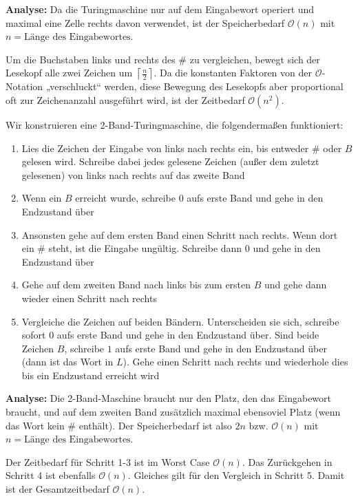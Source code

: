\textbf{Analyse:} Da die Turingmaschine nur auf dem Eingabewort operiert und
maximal eine Zelle rechts davon verwendet, ist der Speicherbedarf
$\mathcal{O}(n)$ mit $n = \text{Länge des Eingabewortes}$.

Um die Buchstaben links und rechts des $\#$ zu vergleichen, bewegt sich der
Lesekopf alle zwei Zeichen um $\left \lceil{\frac{n}{2}}\right \rceil$. Da die
konstanten Faktoren von der $\mathcal{O}$-Notation „verschluckt“ werden, diese
Bewegung des Lesekopfs aber proportional oft zur Zeichenanzahl ausgeführt wird,
ist der Zeitbedarf $\mathcal{O}(n^2)$.


Wir konstruieren eine 2-Band-Turingmaschine, die folgendermaßen funktioniert:

\begin{enumerate}
	\item Lies die Zeichen der Eingabe von links nach rechts ein, bis entweder
		$\#$ oder $B$ gelesen wird. Schreibe dabei jedes gelesene Zeichen (außer
		dem zuletzt gelesenen) von links nach rechts auf das zweite Band
	\item Wenn ein $B$ erreicht wurde, schreibe $0$ aufs erste Band und gehe in
		den Endzustand über
	\item Ansonsten gehe auf dem ersten Band einen Schritt nach rechts. Wenn
		dort ein $\#$ steht, ist die Eingabe ungültig. Schreibe dann $0$ und
		gehe in den Endzustand über
	\item Gehe auf dem zweiten Band nach links bis zum ersten $B$ und gehe dann
		wieder einen Schritt nach rechts
	\item Vergleiche die Zeichen auf beiden Bändern. Unterscheiden sie sich,
		schreibe sofort $0$ aufs erste Band und gehe in den Endzustand über.
		Sind beide Zeichen $B$, schreibe $1$ aufs erste Band und gehe in den
		Endzustand über (dann ist das Wort in $L$). Gehe einen Schritt nach
		rechts und wiederhole dies bis ein Endzustand erreicht wird
\end{enumerate}

\textbf{Analyse:} Die 2-Band-Maschine braucht nur den Platz, den das Eingabewort
braucht, und auf dem zweiten Band zusätzlich maximal ebensoviel Platz (wenn das
Wort kein $\#$ enthält). Der Speicherbedarf ist also $2n$ bzw. $\mathcal{O}(n)$
mit $n = \text{Länge des Eingabewortes}$.

Der Zeitbedarf für Schritt 1-3 ist im Worst Case $\mathcal{O}(n)$. Das
Zurückgehen in Schritt 4 ist ebenfalls $\mathcal{O}(n)$. Gleiches gilt für den
Vergleich in Schritt 5. Damit ist der Gesamtzeitbedarf $\mathcal{O}(n)$.

